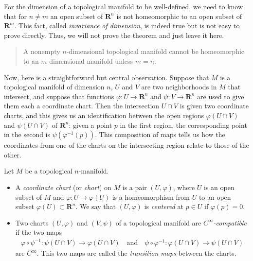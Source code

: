 \begin{remark}
    For the dimension of a topological manifold to be well-defined, we need to know that for $n \neq m$ an open subset of $\mathbf{R}^n$ is not homeomorphic to an open subset of $\mathbf{R}^m$. This fact, called \emph{invariance of dimension}, is indeed true but is not easy to prove directly. Thus, we will not prove the theorem and just leave it here.

\begin{quotation}
    \begin{theorem}\label{lem:topological invariance of dimension}
        A nonempty $n$-dimensional topological manifold cannot be homeomorphic to an $m$-dimensional manifold unless $m = n$.
    \end{theorem}
\end{quotation}
\end{remark}

Now, here is a straightforward but central observation. Suppose that $M$ is a topological manifold of dimension $n$, $U$ and $V$ are two neighborhoods in $M$ that intersect, and suppose that functions $\varphi : U \to \mathbf{R}^n$ and $\psi : V \to \mathbf{R}^n$ are used to give them each a coordinate chart. Then the intersection $U \cap V$ is given two coordinate charts, and this gives us an identification between the open regions $\varphi(U \cap V)$ and $\psi(U \cap V)$ of $\mathbf{R}^n$: given a point $p$ in the first region, the corresponding point in the second is $\psi(\varphi^{-1}(p))$. This composition of maps tells us how the coordinates from one of the charts on the intersecting region relate to those of the other.

\begin{definition}\label{def:compatible chart}
    Let $M$ be a topological $n$-manifold. 
    \begin{itemize}
        \item A \emph{coordinate chart} (or \emph{chart}) on $M$ is a pair $(U, \varphi)$, where $U$ is an open subset of $M$ and $\varphi : U \to \varphi(U)$ is a homeomorphism from $U$ to an open subset $\varphi(U) \subset \mathbf{R}^n$. We say that $(U, \varphi)$ is \emph{centered} at $p \in U$ if $\varphi(p) = 0$.
        \item Two charts $(U, \varphi)$ and $(V, \psi)$ of a topological manifold are \emph{$C^\infty$-compatible} if the two maps
        \begin{align*}
            \varphi \circ \psi^{-1} : \psi(U \cap V) \to \varphi(U \cap V)
            \quad\text{and}\quad
            \psi \circ \varphi^{-1} : \varphi(U \cap V) \to \psi(U \cap V)
        \end{align*}
        are $C^\infty$. This two maps are called the \emph{transition maps} between the charts. 
    \end{itemize}
\end{definition}

